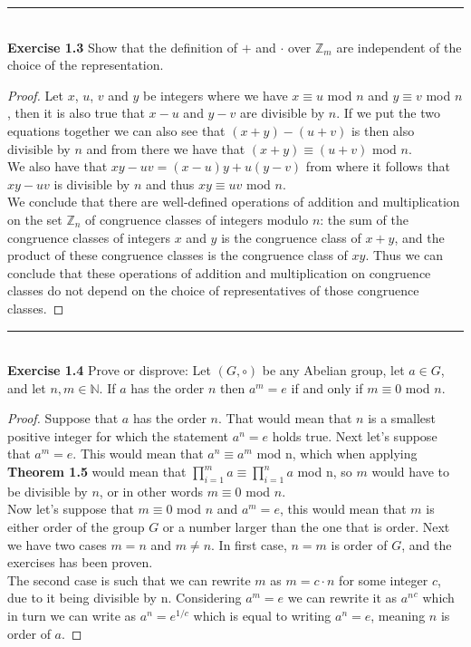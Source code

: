 \documentclass[a4paper]{article}
\begin{document}
\noindent\rule{12cm}{0.4pt}\\
\noindent \textbf{Exercise 1.3} Show that the definition of $+$ and $\cdot$ over $\mathbb{Z}_m$ are independent of the choice of the representation.
\begin{proof}
Let $x$, $u$, $v$ and $y$ be integers where we have $x \equiv u$ mod $n$ and $y \equiv v$ mod $n$, then it is also true that $x -u$ and $y - v$ are divisible by $n$. If we put the two equations together we can also see that $(x + y) - (u + v)$ is then also divisible by $n$ and from there we have that $(x+y) \equiv (u+v)$ mod $n$.\\
We also have that $xy - uv = (x-u)y + u(y-v)$ from where it follows that $xy-uv$ is divisible by $n$ and thus $xy \equiv uv$ mod $n$.\\
We conclude that there are well-defined operations of addition and
multiplication on the set $\mathbb{Z}_{n}$ of congruence classes of integers modulo $n$: the sum of the congruence classes of integers $x$ and $y$ is the congruence class of $x+y$, and the product of these congruence classes is the congruence class of $xy$. Thus we can conclude that these operations of addition and multiplication on congruence classes do not depend on the choice of representatives of those congruence classes.
\end{proof}



\noindent\rule{12cm}{0.4pt}\\
\noindent \textbf{Exercise 1.4} Prove or disprove: Let $(G, \circ)$ be any Abelian group, let $a \in G$, and let $n, m \in \mathbb{N}$. If $a$ has the order $n$ then $a^m=e$ if and only if $m \equiv 0$ mod $n$.
\begin{proof}
Suppose that $a$ has the order $n$. That would mean that $n$ is a smallest positive integer for which the statement $a^n=e$ holds true. Next let's suppose that $a^m=e$. This would mean that $a^n \equiv a^m$ mod n, which when applying \textbf{Theorem 1.5} would mean that $\prod_{i=1}^{m} a \equiv \prod_{i=1}^{n} a$ mod n, so $m$ would have to be divisible by $n$, or in other words $m \equiv 0$ mod $n$.\\
Now let's suppose that $m \equiv 0$ mod $n$ and $a^m=e$, this would mean that $m$ is either order of the group $G$ or a number larger than the one that is order. Next we have two cases $m=n$ and $m \neq n$. In first case, $n=m$ is order of $G$, and the exercises has been proven.\\
The second case is such that we can rewrite $m$ as $m=c\cdot n$ for some integer $c$, due to it being divisible by n. Considering $a^m=e$ we can rewrite it as ${a^n}^c$ which in turn we can write as $a^n=e^{1/c}$ which is equal to writing $a^n=e$, meaning $n$ is order of $a$.
\end{proof}
\end{document}
